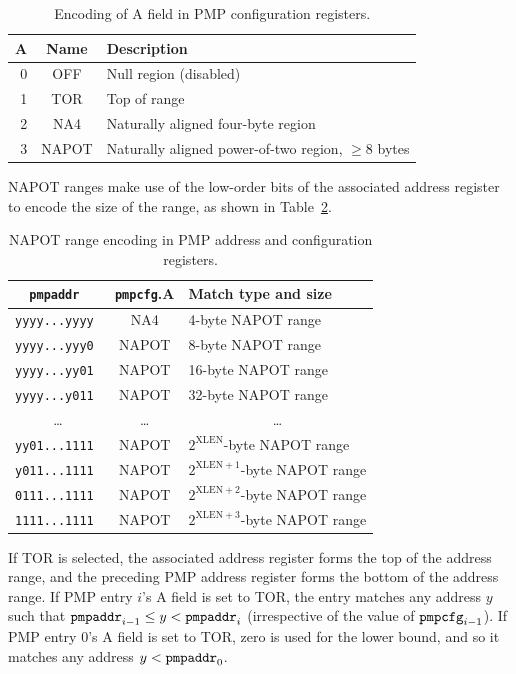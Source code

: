 \begin{table}[h!]
\begin{center}
\begin{tabular}{|r|c|l|}
\hline
A & Name & Description \\
\hline
0 & OFF   & Null region (disabled) \\
1 & TOR   & Top of range \\
2 & NA4   & Naturally aligned four-byte region \\
3 & NAPOT & Naturally aligned power-of-two region, $\ge$8 bytes \\
\hline
\end{tabular}
\end{center}
\caption{Encoding of A field in PMP configuration registers.}
\label{pmpcfg-a}
\end{table}

NAPOT ranges make use of the low-order bits of the associated address register
to encode the size of the range, as shown in Table~\ref{pmpcfg-napot}.

\begin{table}[h!]
\begin{center}
  \begin{tabular}{|c|c|l|}
  \hline
  \tt pmpaddr    & {\tt pmpcfg}.A & Match type and size \\
  \hline
  \tt yyyy...yyyy & NA4   & 4-byte NAPOT range \\
  \tt yyyy...yyy0 & NAPOT & 8-byte NAPOT range \\
  \tt yyyy...yy01 & NAPOT & 16-byte NAPOT range \\
  \tt yyyy...y011 & NAPOT & 32-byte NAPOT range \\
  \multicolumn{1}{|c|}{\ldots} &  \ldots  & \multicolumn{1}{|c|}{\ldots} \\
  \tt yy01...1111 & NAPOT & $2^{\text{XLEN}}$-byte NAPOT range \\
  \tt y011...1111 & NAPOT & $2^{\text{XLEN}+1}$-byte NAPOT range \\
  \tt 0111...1111 & NAPOT & $2^{\text{XLEN}+2}$-byte NAPOT range \\
  \tt 1111...1111 & NAPOT & $2^{\text{XLEN}+3}$-byte NAPOT range \\
  \hline
  \end{tabular}
\end{center}
\caption{NAPOT range encoding in PMP address and configuration registers.}
\label{pmpcfg-napot}
\end{table}

If TOR is selected, the associated address register forms the top of the
address range, and the preceding PMP address register forms the bottom of the
address range.  If PMP entry $i$'s A field is set to TOR, the entry matches
any address $y$ such that ${\tt pmpaddr}_{i-1}\leq y < {\tt pmpaddr}_i$
(irrespective of the value of ${\tt pmpcfg}_{i-1}$).
If
PMP entry 0's A field is set to TOR, zero is used for the lower bound, and so
it matches any address $y < {\tt pmpaddr}_0$.

